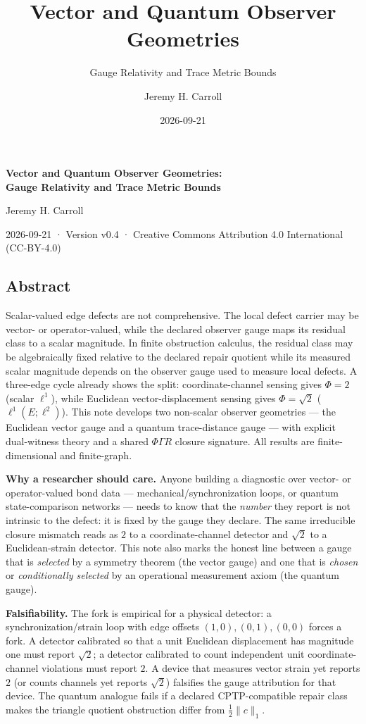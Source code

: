 \documentclass[
  11pt,
]{article}
\title{Vector and Quantum Observer Geometries}
\subtitle{Gauge Relativity and Trace Metric Bounds}
\author{Jeremy H. Carroll}
\date{2026-09-21}
\begin{document}
\begin{center}
{\LARGE\bfseries Vector and Quantum Observer Geometries:\\[0.3em] Gauge Relativity and Trace Metric Bounds\par}
\vspace{1em}
{\large Jeremy H. Carroll\par}
\vspace{0.5em}
{\small 2026-09-21 · Version v0.4 · Creative Commons Attribution 4.0 International (CC-BY-4.0)\par}
\end{center}
\vspace{1.5em}

\subsection{Abstract}\label{abstract}

Scalar-valued edge defects are not comprehensive. The local defect carrier may be vector- or operator-valued, while the declared observer gauge maps its residual class to a scalar magnitude. In finite obstruction calculus, the residual class may be algebraically fixed relative to the declared repair quotient while its measured scalar magnitude depends on the observer gauge used to measure local defects. A three-edge cycle already shows the split: coordinate-channel sensing gives \(\Phi=2\) (scalar \(\ell^1\)), while Euclidean vector-displacement sensing gives \(\Phi=\sqrt{2}\) (\(\ell^1(E;\ell^2)\)). This note develops two non-scalar observer geometries --- the Euclidean vector gauge and a quantum trace-distance gauge --- with explicit dual-witness theory and a shared \(\Phi\Gamma R\) closure signature. All results are finite-dimensional and finite-graph.

\textbf{Why a researcher should care.} Anyone building a diagnostic over vector- or operator-valued bond data --- mechanical/synchronization loops, or quantum state-comparison networks --- needs to know that the \emph{number} they report is not intrinsic to the defect: it is fixed by the gauge they declare. The same irreducible closure mismatch reads as \(2\) to a coordinate-channel detector and \(\sqrt2\) to a Euclidean-strain detector. This note also marks the honest line between a gauge that is \emph{selected} by a symmetry theorem (the vector gauge) and one that is \emph{chosen} or \emph{conditionally selected} by an operational measurement axiom (the quantum gauge).

\textbf{Falsifiability.} The fork is empirical for a physical detector: a synchronization/strain loop with edge offsets \((1,0),(0,1),(0,0)\) forces a fork. A detector calibrated so that a unit Euclidean displacement has magnitude one must report \(\sqrt2\); a detector calibrated to count independent unit coordinate-channel violations must report \(2\). A device that measures vector strain yet reports \(2\) (or counts channels yet reports \(\sqrt2\)) falsifies the gauge attribution for that device. The quantum analogue fails if a declared CPTP-compatible repair class makes the triangle quotient obstruction differ from \(\tfrac12\lVert c\rVert_1\).
\end{document}
